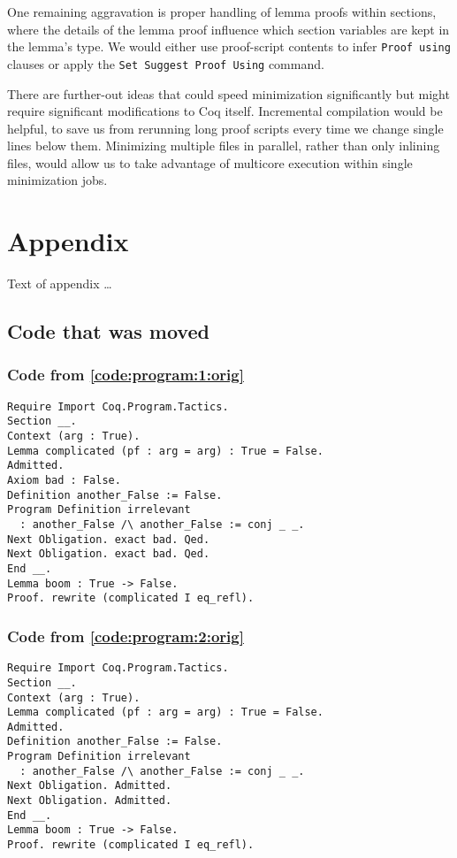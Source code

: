 \documentclass[a4paper,USenglish,cleveref,autoref,thm-restate]{lipics-v2021}
\begin{document}
One remaining aggravation is proper handling of lemma proofs within sections, where the details of the lemma proof influence which section variables are kept in the lemma's type.
We would either use proof-script contents to infer \verb|Proof using| clauses or apply the \verb|Set Suggest Proof Using| command.

There are further-out ideas that could speed minimization significantly but might require significant modifications to Coq itself.
Incremental compilation would be helpful, to save us from rerunning long proof scripts every time we change single lines below them.
Minimizing multiple files in parallel, rather than only inlining files, would allow us to take advantage of multicore execution within single minimization jobs.






\appendix
\section{Appendix}

Text of appendix \ldots

\subsection{Code that was moved}

\subsubsection{Code from \autoref{code:program:1:orig}}\label{code:program:1}
\begin{verbatim}
Require Import Coq.Program.Tactics.
Section __.
Context (arg : True).
Lemma complicated (pf : arg = arg) : True = False.
Admitted.
Axiom bad : False.
Definition another_False := False.
Program Definition irrelevant
  : another_False /\ another_False := conj _ _.
Next Obligation. exact bad. Qed.
Next Obligation. exact bad. Qed.
End __.
Lemma boom : True -> False.
Proof. rewrite (complicated I eq_refl).
\end{verbatim}
\subsubsection{Code from \autoref{code:program:2:orig}}\label{code:program:2}
\begin{verbatim}
Require Import Coq.Program.Tactics.
Section __.
Context (arg : True).
Lemma complicated (pf : arg = arg) : True = False.
Admitted.
Definition another_False := False.
Program Definition irrelevant
  : another_False /\ another_False := conj _ _.
Next Obligation. Admitted.
Next Obligation. Admitted.
End __.
Lemma boom : True -> False.
Proof. rewrite (complicated I eq_refl).
\end{verbatim}
\end{document}
